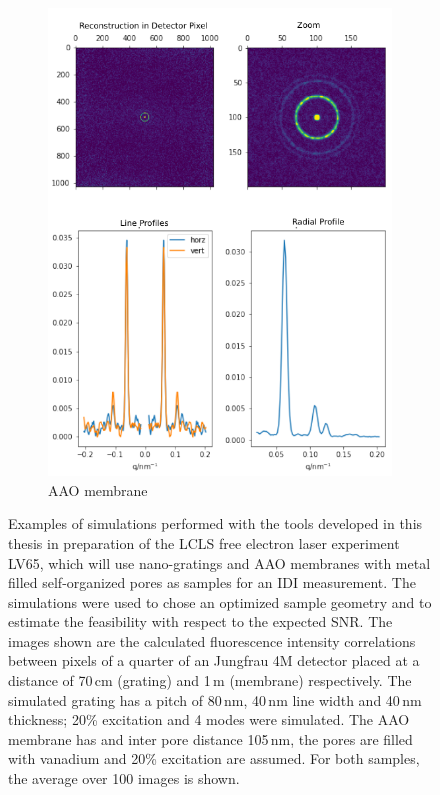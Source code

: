\begin{figure}
\begin{subfigure}[b]{0.37\textwidth}
	\includegraphics[width=\linewidth]{images/lv65simB.pdf}
	\caption{AAO membrane  }
	\label{fig:outlook_aao}
\end{subfigure}
\caption[Simulations in Preparation of LV65 Experiment]{Examples of simulations performed with the tools developed in this thesis in preparation of the LCLS free electron laser experiment LV65, which will use nano-gratings and AAO membranes with metal filled self-organized pores as samples for an IDI measurement. The simulations were used to chose an optimized sample geometry and to estimate the feasibility with respect to the expected SNR. The images shown are the calculated fluorescence intensity correlations between pixels of a quarter of an Jungfrau 4M detector placed at a distance of 70\,cm (grating) and 1\,m (membrane) respectively. The simulated grating has a pitch of 80\,nm, 40\,nm line width and 40\,nm thickness; 20\% excitation and 4 modes were simulated. The AAO membrane has and inter pore distance 105\,nm, the pores are filled with vanadium and 20\% excitation are assumed. For both samples, the average over 100 images is shown.}
\end{figure}

